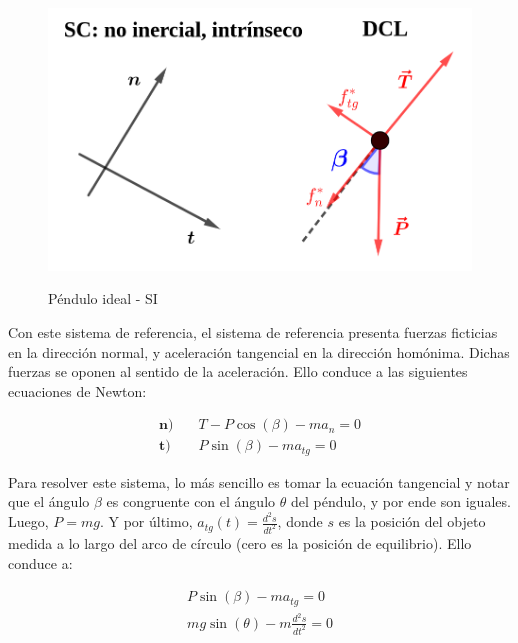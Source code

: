 \documentclass{article}
\begin{document}
\begin{figure}[ht]
\centering
\caption{Péndulo ideal - SI}
\includegraphics[scale=1]{../../common/img/62.01/theory/14-dynamics-ideal-pendulum-ni.png}
\label{fig:ideal-pendulum-ni}
\end{figure}

Con este sistema de referencia, el sistema de referencia presenta fuerzas ficticias en la dirección normal, y aceleración tangencial en la dirección homónima. Dichas fuerzas se oponen al sentido de la aceleración. Ello conduce a las siguientes ecuaciones de Newton:

\begin{subequations}
\begin{align}
\textbf{n)} & \quad T - P \cos(\beta) - m a_n = 0 \\
\textbf{t)} & \quad P \sin(\beta) - m a_{tg} = 0
\end{align}
\end{subequations}

Para resolver este sistema, lo más sencillo es tomar la ecuación tangencial y notar que el ángulo $\beta$ es congruente con el ángulo $\theta$ del péndulo, y por ende son iguales. Luego, $P = m g$. Y por último, $a_{tg}(t) = \frac{d^2s}{dt^2}$, donde $s$ es la posición del objeto medida a lo largo del arco de círculo (cero es la posición de equilibrio). Ello conduce a:

\begin{subequations}
\begin{align}
P \sin(\beta) - m a_{tg} = 0 \\
m g \sin(\theta) - m \frac{d^2s}{dt^2} = 0
\end{align}
\end{subequations}
\end{document}
